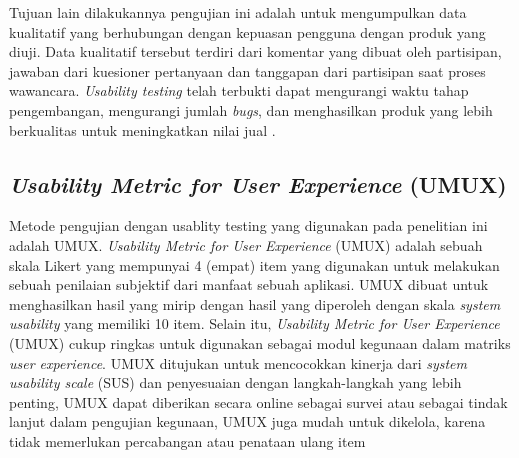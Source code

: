 \par Tujuan lain dilakukannya pengujian ini adalah untuk mengumpulkan data kualitatif yang berhubungan dengan kepuasan pengguna dengan produk yang diuji. Data kualitatif tersebut terdiri dari komentar yang dibuat oleh partisipan, jawaban dari kuesioner pertanyaan dan tanggapan dari partisipan saat proses wawancara. \textit{Usability testing} telah terbukti dapat mengurangi waktu tahap pengembangan, mengurangi jumlah \textit{bugs}, dan menghasilkan produk yang lebih berkualitas untuk meningkatkan nilai jual \citep{Wahl2000}.

\subsection{\textit{Usability Metric for User Experience }(UMUX)} Metode pengujian dengan usablity testing yang digunakan pada penelitian ini adalah UMUX. \textit{Usability Metric for User Experience} (UMUX) adalah sebuah skala Likert yang mempunyai 4 (empat) item yang digunakan untuk melakukan sebuah penilaian subjektif dari manfaat sebuah aplikasi. UMUX dibuat untuk menghasilkan hasil yang mirip dengan hasil yang diperoleh dengan skala \textit{system usability} yang memiliki 10 item. Selain itu, \textit{Usability Metric for User Experience} (UMUX) cukup ringkas untuk digunakan sebagai modul kegunaan dalam matriks \textit{user experience}. UMUX ditujukan untuk mencocokkan kinerja dari \textit{system usability scale} (SUS) dan penyesuaian dengan langkah-langkah yang lebih penting, UMUX dapat diberikan secara online sebagai survei atau sebagai tindak lanjut dalam pengujian kegunaan, UMUX juga mudah untuk dikelola, karena tidak memerlukan percabangan atau penataan ulang item \citep{Finstad2010}





